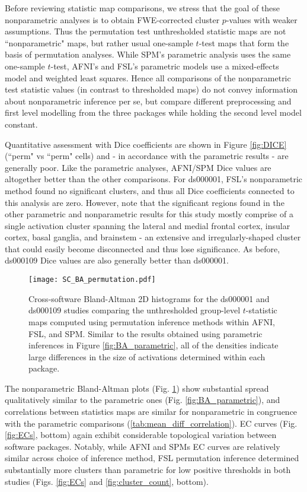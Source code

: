 Before reviewing statistic map comparisons, we stress that the goal of these nonparametric analyses is to obtain FWE-corrected cluster $p$-values with weaker assumptions. Thus the permutation test unthresholded statistic maps are not ``nonparametric" maps, but rather usual one-sample $t$-test maps that form the basis of permutation analyses. While SPM's parametric analysis uses the same one-sample $t$-test, AFNI's and FSL's parametric models use a mixed-effects model and weighted least squares. Hence all comparisons of the nonparametric test statistic values (in contrast to thresholded maps) do not convey information about nonparametric inference per se, but compare different preprocessing and first level modelling from the three packages while holding the second level model constant.

Quantitative assessment with Dice coefficients are shown in Figure \ref{fig:DICE} (``perm" vs ``perm" cells) and - in accordance with the parametric results - are generally poor. Like the parametric analyses, AFNI/SPM Dice values are altogether better than the other comparisons. For ds000001, FSL's nonparametric method found no significant clusters, and thus all Dice coefficients connected to this analysis are zero. However, note that the significant regions found in the other parametric and nonparametric results for this study mostly comprise of a single activation cluster spanning the lateral and medial frontal cortex, insular cortex, basal ganglia, and brainstem - an extensive and irregularly-shaped cluster that could easily become disconnected and thus lose significance. As before, ds000109 Dice values are also generally better than ds000001.

\begin{figure}[htbp]
\centering
	\texttt{[image: SC\_BA\_permutation.pdf]}	
\caption{Cross-software Bland-Altman 2D histograms for the ds000001 and ds000109 studies comparing the unthresholded group-level $t$-statistic maps computed using permutation inference methods within AFNI, FSL, and SPM. Similar to the results obtained using parametric inferences in Figure \ref{fig:BA_parametric}, all of the densities indicate large differences in the size of activations determined within each package.}
\label{fig:BA_permutation}
\end{figure}

The nonparametric Bland-Altman plots (Fig. \ref{fig:BA_permutation}) show substantial spread qualitatively similar to the parametric ones (Fig. \ref{fig:BA_parametric}), and correlations between statistics maps are similar for nonparametric in congruence with the parametric comparisons (\ref{tab:mean_diff_correlation}). EC curves (Fig. \ref{fig:ECs}, bottom) again exhibit considerable topological variation between software packages. Notably, while AFNI and SPMs EC curves are relatively similar across choice of inference method, FSL permutation inference determined substantially more clusters than parametric for low positive thresholds in both studies (Figs. \ref{fig:ECs} and \ref{fig:cluster_count}, bottom).

